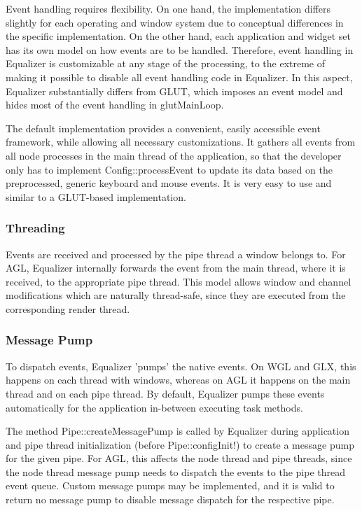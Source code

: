 \documentclass[10pt,a4]{scrartcl}
\begin{document}
Event handling requires flexibility. On one hand, the implementation
differs slightly for each operating and window system due to conceptual
differences in the specific implementation. On the other hand, each
application and widget set has its own model on how events are to be
handled. Therefore, event handling in Equalizer is customizable at any
stage of the processing, to the extreme of making it possible to disable
all event handling code in Equalizer. In this aspect, Equalizer
substantially differs from GLUT, which imposes an event model and hides
most of the event handling in \textsf{glutMainLoop}.

The default implementation provides a convenient, easily accessible
event framework, while allowing all necessary customizations. It gathers
all events from all node processes in the main thread of the
application, so that the developer only has to implement
\textsf{Config::processEvent} to update its data based on the
preprocessed, generic keyboard and mouse events. It is very easy to use
and similar to a GLUT-based implementation.


\subsubsection{Threading}

Events are received and processed by the pipe thread a window belongs
to. For AGL, Equalizer internally forwards the event from the main
thread, where it is received, to the appropriate pipe thread. This model allows
window and channel modifications which are naturally thread-safe, since they are
executed from the corresponding render thread.

\subsubsection{\label{sMessagePump}Message Pump}

To dispatch events, Equalizer 'pumps' the native events. On WGL and GLX, this
happens on each thread with windows, whereas on AGL it happens on the main
thread and on each pipe thread. By default, Equalizer pumps these events
automatically for the application in-between executing task methods.

The method \textsf{Pipe::createMessagePump} is called by Equalizer during
application and pipe thread initialization (before \textsf{Pipe::configInit}!)
to create a message pump for the given pipe. For AGL, this affects the node
thread and pipe threads, since the node thread message pump needs to dispatch
the events to the pipe thread event queue. Custom message pumps may be
implemented, and it is valid to return no message pump to disable message
dispatch for the respective pipe.
\end{document}
